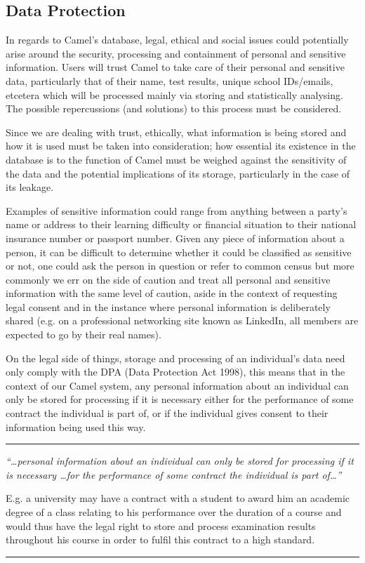     \subsection*{Data Protection}
    In regards to Camel’s database, legal, ethical and social issues could potentially arise around the security, processing and containment of personal and sensitive information. Users will trust Camel to take care of their personal and sensitive data, particularly that of their name, test results, unique school IDs/emails, etcetera which will be processed mainly via storing and statistically analysing. The possible repercussions (and solutions) to this process must be considered.

    Since we are dealing with trust, ethically, what information is being stored and how it is used must be taken into consideration; how essential its existence in the database is to the function of Camel must be weighed against the sensitivity of the data and the potential implications of its storage, particularly in the case of its leakage.

    Examples of sensitive information could range from anything between a party’s name or address to their learning difficulty or financial situation to their national insurance number or passport number. Given any piece of information about a person, it can be difficult to determine whether it could be classified as sensitive or not, one could ask the person in question or refer to common census but more commonly we err on the side of caution and treat all personal and sensitive information with the same level of caution, aside in the context of requesting legal consent and in the instance where personal information is deliberately shared (e.g. on a professional networking site known as LinkedIn, all members are expected to go by their real names).
    
    On the legal side of things, storage and processing of an individual’s data need only comply with the DPA (Data Protection Act 1998), this means that in the context of our Camel system, any personal information about an individual can only be stored for processing if it is necessary either for the performance of some contract the individual is part of, or if the individual gives consent to their information being used this way.\cite{DPA:tDPP:S1}\cite{DPA:tDPP:S2}
    
    \vspace{0.35cm}
    \hrule
    {\raggedright \small \em “\ldots personal information about an individual can only be stored for processing if it is necessary \ldots for the performance of some contract the individual is part of…” \par} 
    {\raggedleft \scriptsize E.g. a university may have a contract with a student to award him an academic degree of a class relating to his performance over the duration of a course and would thus have the legal right to store and process examination results throughout his course in order to fulfil this contract to a high standard. \par}
    \vspace{0.35cm}
    \hrule

